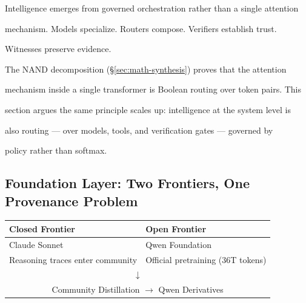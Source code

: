 Intelligence emerges from governed orchestration rather than a single attention


mechanism. Models specialize. Routers compose. Verifiers establish trust.


Witnesses preserve evidence.





The NAND decomposition (\S\ref{sec:math-synthesis}) proves that the attention


mechanism inside a single transformer is Boolean routing over token pairs. This


section argues the same principle scales up: intelligence at the system level is


also routing --- over models, tools, and verification gates --- governed by


policy rather than softmax.





\subsection{Foundation Layer: Two Frontiers, One Provenance Problem}





\begin{center}


\begin{tabular}{p{5.5cm}p{5.5cm}}


\textbf{Closed Frontier} & \textbf{Open Frontier} \\


\hline


Claude Sonnet & Qwen Foundation \\


Reasoning traces enter community & Official pretraining (36T tokens) \\


\multicolumn{2}{c}{$\downarrow$} \\


\multicolumn{2}{c}{Community Distillation $\rightarrow$ Qwen Derivatives} \\


\end{tabular}


\end{center}





